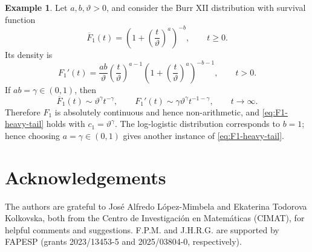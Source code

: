 \documentclass[reqno,final,11pt]{amsart}
\theoremstyle{plain}
\theoremstyle{definition}
\newtheorem{example}[theorem]{Example}
\theoremstyle{remark}
\numberwithin{equation}{section}
\begin{document}
\begin{example}\label{ex:burr-loglogistic}
Let \(a,b,\vartheta>0\), and consider the Burr XII distribution with survival function
\[
  \overline F_1(t)=
  \left(1+\left(\frac{t}{\vartheta}\right)^a\right)^{-b},
  \qquad t\ge0.
\]
Its density is
\[
  F_1'(t)=\frac{ab}{\vartheta}
  \left(\frac{t}{\vartheta}\right)^{a-1}
  \left(1+\left(\frac{t}{\vartheta}\right)^a\right)^{-b-1},
  \qquad t>0.
\]
If \(ab=\gamma\in(0,1)\), then
\[
  \overline F_1(t)\sim\vartheta^\gamma t^{-\gamma},
  \qquad
  F_1'(t)\sim\gamma\vartheta^\gamma t^{-1-\gamma},
  \qquad t\to\infty.
\]
Therefore \(F_1\) is absolutely continuous and hence non-arithmetic, and \eqref{eq:F1-heavy-tail} holds with \(c_1=\vartheta^\gamma\). The log-logistic distribution corresponds to \(b=1\); hence choosing \(a=\gamma\in(0,1)\) gives another instance of \eqref{eq:F1-heavy-tail}.
\end{example}



\section*{Acknowledgements} The authors are grateful to José Alfredo López-Mimbela and Ekaterina Todorova Kolkovska, both from the Centro de Investigación en Matemáticas (CIMAT), for helpful comments and suggestions. F.P.M. and J.H.R.G. are supported by FAPESP (grants 2023/13453-5 and 2025/03804-0, respectively).
\end{document}
